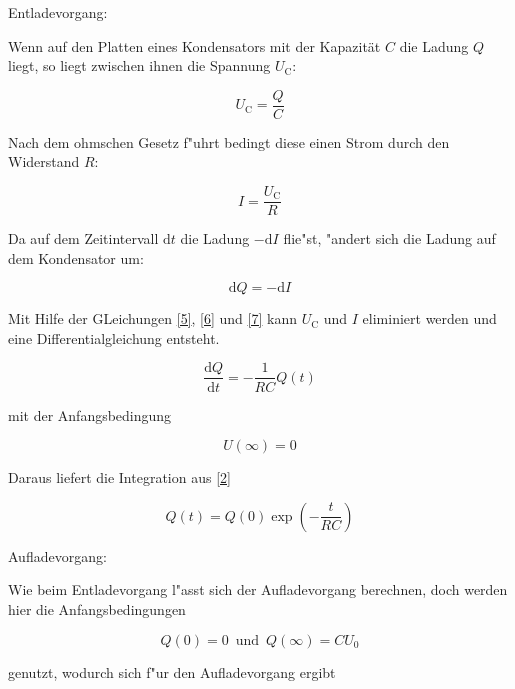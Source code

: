 \documentclass{scrartcl}
\begin{document}
				Entladevorgang:

				Wenn auf den Platten eines Kondensators mit der Kapazität $C$ die Ladung $Q$ liegt, so liegt zwischen ihnen die Spannung $U_\mathrm{C}$:

				\begin{equation}
					U_\mathrm{C} = \frac{Q}{C} \label{5}
				\end{equation}

				Nach dem ohmschen Gesetz f"uhrt bedingt diese einen Strom durch den Widerstand $R$:

				\begin{equation}
					I = \frac{U_\mathrm{C}}{R} \label{6}
				\end{equation}

				Da auf dem Zeitintervall $\mathrm{d}t$ die Ladung $-\mathrm{d} I$ flie"st, "andert sich die Ladung auf dem Kondensator um: 

				\begin{equation}
					\mathrm{d} Q = -\mathrm{d}I \label{7}
				\end{equation}

				Mit Hilfe der GLeichungen \ref{5}, \ref{6} und \ref{7} kann $U_\mathrm{C}$ und $I$ eliminiert werden und eine Differentialgleichung entsteht.

				\begin{equation}
					\frac{\mathrm{d}Q}{\mathrm{d}t} = -\frac{1}{RC}Q(t)
				\end{equation}

				mit der Anfangsbedingung

				\begin{equation}
					U(\infty) = 0
				\end{equation}

				Daraus liefert die Integration aus \ref{2}

				\begin{equation}
					Q(t) = Q(0) \exp{ \left( -\frac{t}{RC} \right) }
				\end{equation}

				Aufladevorgang:

				Wie beim Entladevorgang l"asst sich der Aufladevorgang berechnen, doch werden hier die Anfangsbedingungen

				\begin{equation}
					Q(0) = 0 \, \, \, \mathrm{und} \, \, \, Q(\infty) = C U_\mathrm{0}
				\end{equation}

				genutzt, wodurch sich f"ur den Aufladevorgang ergibt
\end{document}
